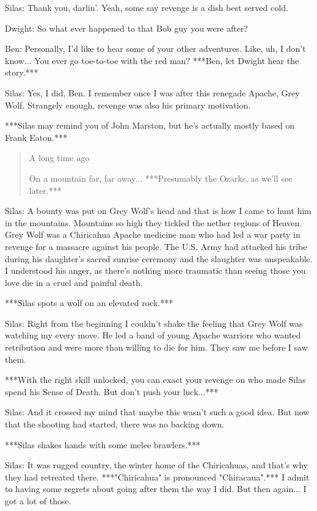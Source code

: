 \documentclass{article}
\begin{document}
Silas: Thank you, darlin'. Yeah, some say revenge is a dish best served cold.

Dwight: So what ever happened to that Bob guy you were after?

Ben: Personally, I'd like to hear some of your other adventures. Like, uh, I don't know... You ever go toe-to-toe with the red man? ***Ben, let Dwight hear the story.***

Silas: Yes, I did, Ben. I remember once I was after this renegade Apache, Grey Wolf. Strangely enough, revenge was also his primary motivation.

***Silas may remind you of John Marston, but he's actually mostly based on Frank Eaton.***

\begin{quote}
    A long time ago
    
    On a mountain far, far away... ***Presumably the Ozarks, as we'll see later.***
\end{quote}

Silas: A bounty was put on Grey Wolf's head and that is how I came to hunt him in the mountains. Mountains so high they tickled the nether regions of Heaven. Grey Wolf was a Chiricahua Apache medicine man who had led a war party in revenge for a massacre against his people. The U.S. Army had attacked his tribe during his daughter's sacred sunrise ceremony and the slaughter was unspeakable. I understood his anger, as there's nothing more traumatic than seeing those you love die in a cruel and painful death.

***Silas spots a wolf on an elevated rock.***

Silas: Right from the beginning I couldn't shake the feeling that Grey Wolf was watching my every move. He led a band of young Apache warriors who wanted retribution and were more than willing to die for him. They saw me before I saw them.

***With the right skill unlocked, you can exact your revenge on who made Silas spend his Sense of Death. But don't push your luck...***

Silas: And it crossed my mind that maybe this wasn't such a good idea. But now that the shooting had started, there was no backing down.

***Silas shakes hands with some melee brawlers.***

Silas: It was rugged country, the winter home of the Chiricahuas, and that's why they had retreated there. ***"Chiricahua" is pronounced "Chiracaua".*** I admit to having some regrets about going after them the way I did. But then again... I got a lot of those.
\end{document}
